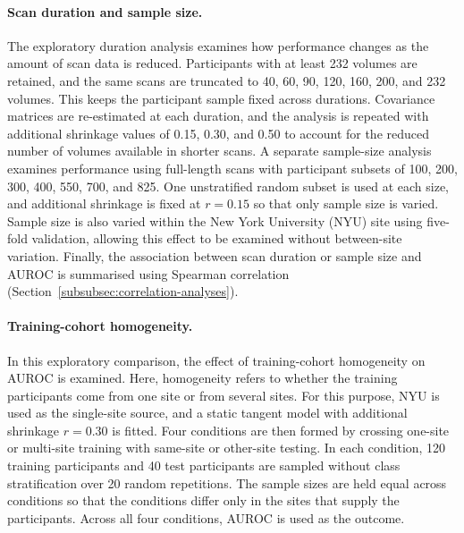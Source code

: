 \paragraph{\textbf{Scan duration and sample size.}}
\label{par:duration-sample-size}
The exploratory duration analysis examines how performance changes as the amount of scan data is reduced. Participants with at least 232 volumes are retained, and the same scans are truncated to 40, 60, 90, 120, 160, 200, and 232 volumes. This keeps the participant sample fixed across durations. Covariance matrices are re-estimated at each duration, and the analysis is repeated with additional shrinkage values of 0.15, 0.30, and 0.50 to account for the reduced number of volumes available in shorter scans. A separate sample-size analysis examines performance using full-length scans with participant subsets of 100, 200, 300, 400, 550, 700, and 825. One unstratified random subset is used at each size, and additional shrinkage is fixed at $r=0.15$ so that only sample size is varied. Sample size is also varied within the New York University (NYU) site using five-fold validation, allowing this effect to be examined without between-site variation. Finally, the association between scan duration or sample size and AUROC is summarised using Spearman correlation (Section~\ref{subsubsec:correlation-analyses}).

\paragraph{\textbf{Training-cohort homogeneity.}}
\label{par:training-homogeneity}
In this exploratory comparison, the effect of training-cohort homogeneity on AUROC is
examined. Here, homogeneity refers to whether the training participants come from one site
or from several sites. For this purpose, NYU is used as the single-site source, and a static
tangent model with additional shrinkage $r=0.30$ is fitted. Four conditions are then formed
by crossing one-site or multi-site training with same-site or other-site testing. In each
condition, 120 training participants and 40 test participants are sampled without class
stratification over 20 random repetitions. The sample sizes are held equal across conditions
so that the conditions differ only in the sites that supply the participants. Across all
four conditions, AUROC is used as the outcome.

